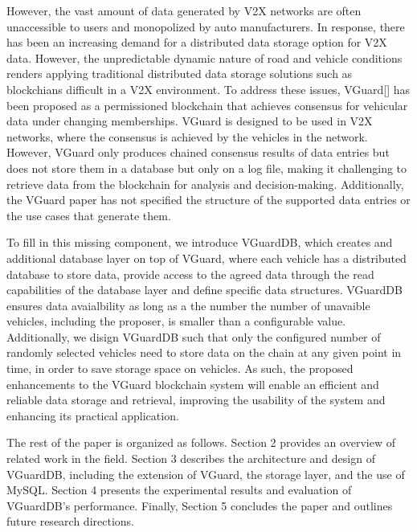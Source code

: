 However, the vast amount of data generated by V2X networks are often unaccessible to users and monopolized by auto manufacturers. In response, there has been an increasing demand for a distributed data storage option for V2X data. However, the unpredictable dynamic nature of road and vehicle conditions renders applying traditional distributed data storage solutions such as blockchians difficult in a V2X environment. To address these issues, VGuard[] has been proposed as a permissioned blockchain that achieves consensus for vehicular data under changing memberships. VGuard is designed to be used in V2X networks, where the consensus is achieved by the vehicles in the network. However, VGuard only produces chained consensus results of data entries but does not store them in a database but only on a log file, making it challenging to retrieve data from the blockchain for analysis and decision-making. Additionally, the VGuard paper has not specified the structure of the supported data entries or the use cases that generate them. 

To fill in this missing component, we introduce VGuardDB, which creates and additional database layer on top of VGuard, where each vehicle has a distributed database to store data, provide access to the agreed data through the read capabilities of the database layer and define specific data structures. VGuardDB ensures data avaialbility as long as a the number the number of unavaible vehicles, including the proposer, is smaller than a configurable value. Additionally, we disign VGuardDB such that only the configured number of randomly selected vehicles need to store data on the chain at any given point in time, in order to save storage space on vehicles. As such, the proposed enhancements to the VGuard blockchain system will enable an efficient and reliable data storage and retrieval, improving the usability of the system and enhancing its practical application.

The rest of the paper is organized as follows. Section 2 provides an overview of related work in the field. Section 3 describes the architecture and design of VGuardDB, including the extension of VGuard, the storage layer, and the use of MySQL. Section 4 presents the experimental results and evaluation of VGuardDB's performance. Finally, Section 5 concludes the paper and outlines future research directions.

